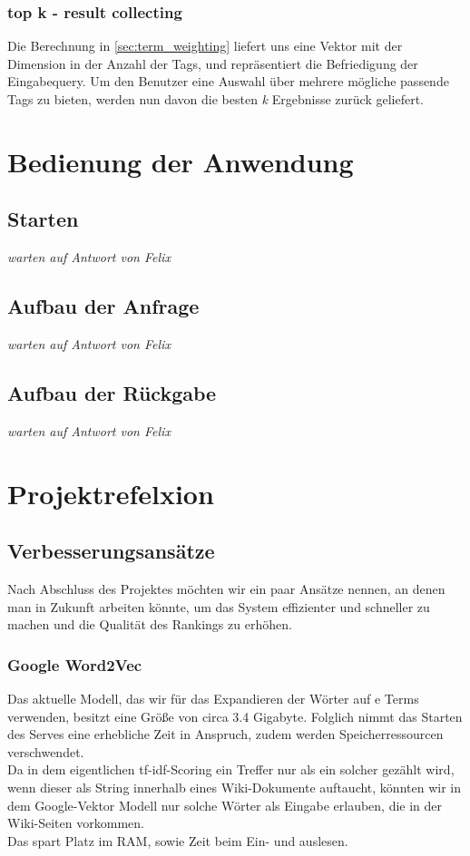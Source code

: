 \documentclass[12pt,pdftex,a4paper]{article}
\begin{document}
\subsubsection{top k - result collecting}
Die Berechnung in \autoref{sec:term_weighting} liefert uns eine Vektor mit der Dimension in der Anzahl der Tags, und repräsentiert die Befriedigung der Eingabequery. Um den Benutzer eine Auswahl über mehrere mögliche passende Tags zu bieten, werden nun davon die besten \textit{k} Ergebnisse zurück geliefert.


\section{Bedienung der Anwendung}

\subsection{Starten}
\textit{warten auf Antwort von Felix}
\subsection{Aufbau der Anfrage}
\textit{warten auf Antwort von Felix}
\subsection{Aufbau der Rückgabe}
\textit{warten auf Antwort von Felix}

\section{Projektrefelxion}
\subsection{Verbesserungsansätze}
Nach Abschluss des Projektes möchten wir ein paar Ansätze nennen, an denen man in Zukunft arbeiten könnte, um das System effizienter und schneller zu machen und die Qualität des Rankings zu erhöhen.
\subsubsection{Google Word2Vec}
Das aktuelle Modell, das wir für das Expandieren der Wörter auf e Terms verwenden, besitzt eine Größe von circa 3.4 Gigabyte. Folglich nimmt das Starten des Serves eine erhebliche Zeit in Anspruch, zudem werden Speicherressourcen verschwendet.\\
Da in dem eigentlichen tf-idf-Scoring ein Treffer nur als ein solcher gezählt wird, wenn dieser als String innerhalb eines Wiki-Dokumente auftaucht, könnten wir in dem Google-Vektor Modell nur solche Wörter als Eingabe erlauben, die in der Wiki-Seiten vorkommen.\\
Das spart Platz im RAM, sowie Zeit beim Ein- und auslesen.
\end{document}
